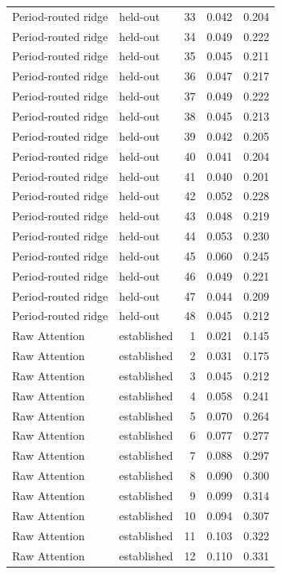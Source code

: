 \begin{tabular}{llrrr}
Period-routed ridge & held-out & 33 & 0.042 & 0.204 \\
Period-routed ridge & held-out & 34 & 0.049 & 0.222 \\
Period-routed ridge & held-out & 35 & 0.045 & 0.211 \\
Period-routed ridge & held-out & 36 & 0.047 & 0.217 \\
Period-routed ridge & held-out & 37 & 0.049 & 0.222 \\
Period-routed ridge & held-out & 38 & 0.045 & 0.213 \\
Period-routed ridge & held-out & 39 & 0.042 & 0.205 \\
Period-routed ridge & held-out & 40 & 0.041 & 0.204 \\
Period-routed ridge & held-out & 41 & 0.040 & 0.201 \\
Period-routed ridge & held-out & 42 & 0.052 & 0.228 \\
Period-routed ridge & held-out & 43 & 0.048 & 0.219 \\
Period-routed ridge & held-out & 44 & 0.053 & 0.230 \\
Period-routed ridge & held-out & 45 & 0.060 & 0.245 \\
Period-routed ridge & held-out & 46 & 0.049 & 0.221 \\
Period-routed ridge & held-out & 47 & 0.044 & 0.209 \\
Period-routed ridge & held-out & 48 & 0.045 & 0.212 \\
Raw Attention & established & 1 & 0.021 & 0.145 \\
Raw Attention & established & 2 & 0.031 & 0.175 \\
Raw Attention & established & 3 & 0.045 & 0.212 \\
Raw Attention & established & 4 & 0.058 & 0.241 \\
Raw Attention & established & 5 & 0.070 & 0.264 \\
Raw Attention & established & 6 & 0.077 & 0.277 \\
Raw Attention & established & 7 & 0.088 & 0.297 \\
Raw Attention & established & 8 & 0.090 & 0.300 \\
Raw Attention & established & 9 & 0.099 & 0.314 \\
Raw Attention & established & 10 & 0.094 & 0.307 \\
Raw Attention & established & 11 & 0.103 & 0.322 \\
Raw Attention & established & 12 & 0.110 & 0.331 \\

\end{tabular}

